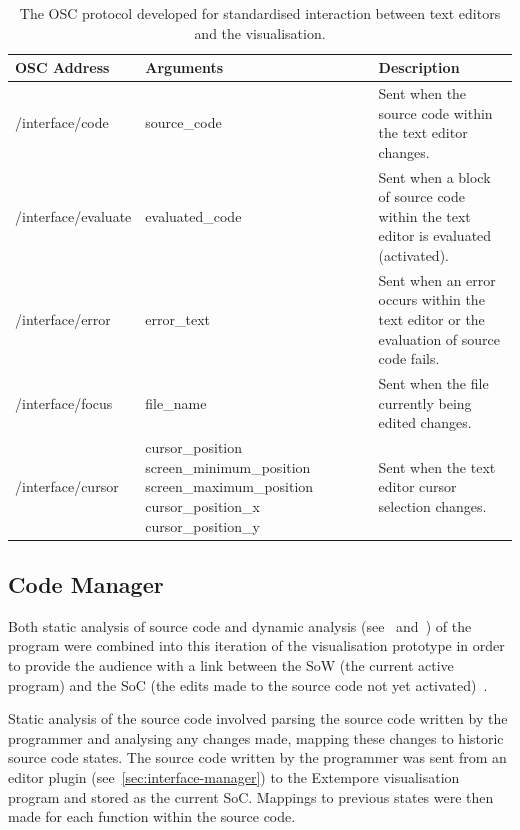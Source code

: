 \begin{table}
  \centering
  \begin{tabular}{|l|p{4.75cm}|p{4.75cm}|}
  \hline
  \textbf{OSC Address} & \textbf{Arguments} & \textbf{Description}\\
  \hline
	/interface/code & source\_code & Sent when the source code within the text editor changes.\\
	\hline
	/interface/evaluate & evaluated\_code & Sent when a block of source code within the text editor is evaluated (activated). \\
	\hline
	/interface/error & error\_text & Sent when an error occurs within the text editor or the evaluation of source code fails.\\
	\hline
	/interface/focus & file\_name & Sent when the file currently being edited changes.\\
	\hline
	/interface/cursor & cursor\_position \newline screen\_minimum\_position \newline screen\_maximum\_position \newline cursor\_position\_x \newline cursor\_position\_y & Sent when the text editor cursor selection changes. \\
  \hline
  \end{tabular}
  \caption{The OSC protocol developed for standardised interaction between text editors and the visualisation.}
  \label{table:osc-protocol}
\end{table}

\subsection{Code Manager}

Both static analysis of source code and dynamic analysis (see~\cite{Eisenbarth2003} and~\cite{Jerding1997}) of the program were combined into this iteration of the visualisation prototype in order to provide the audience with a link between the \acf{SoW} (the current active program) and the \acf{SoC} (the edits made to the source code not yet activated)~\cite{Swift2013}.

Static analysis of the source code involved parsing the source code written by the programmer and analysing any changes made, mapping these changes to historic source code states. The source code written by the programmer was sent from an editor plugin (see~\ref{sec:interface-manager}) to the Extempore visualisation program and stored as the current \ac{SoC}. Mappings to previous states were then made for each function within the source code.

